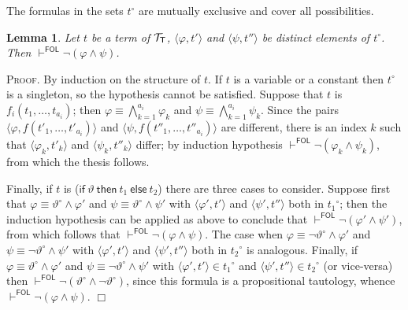 \documentclass{article}
\newtheorem{lemma}[definition]{Lemma}
\newenvironment{proof}{\smallskip\textsc{Proof.}}{\hspace*{\fill}$\Box$}
\newcommand{\ifthelse}[3]{\ensuremath{\mathsf{if}\ {#1}\ \mathsf{then}\ {#2}\ \mathsf{else}\ {#3}}}
\newcommand{\ofun}[1]{\ensuremath{{#1}^\circ}}
\newcommand{\pair}[2]{\ensuremath{\langle{#1},{#2}\rangle}}
\newcommand{\terms}[1]{\ensuremath{{\cal T}_{\mathsf{#1}}}}
\newcommand{\myvdash}[1]{\ensuremath{\vdash^{\mathsf{#1}}}}
\begin{document}
\bigskip\noindent
The formulas in the sets {\ofun t} are mutually exclusive and cover all
possibilities.
\begin{lemma}\label{ofunfalse}
Let $t$ be a term of {\terms{T}}, {\pair\varphi{t'}} and
{\pair\psi{t''}} be distinct elements of {\ofun{t}}.
Then $\myvdash{FOL}\neg(\varphi\wedge\psi)$.
\end{lemma}
\begin{proof}
By induction on the structure of $t$.  If $t$ is a variable or a constant
then {\ofun{t}} is a singleton, so the hypothesis cannot be satisfied.
Suppose that $t$ is $f_i(t_1,\ldots,t_{a_i})$; then
$\varphi\equiv\bigwedge_{k=1}^{a_i}\varphi_k$ and
$\psi\equiv\bigwedge_{k=1}^{a_i}\psi_k$.
Since the pairs {\pair\varphi{f(t'_1,\ldots,t'_{a_i})}} and
{\pair\psi{f(t''_1,\ldots,t''_{a_i})}} are different, there is an
index $k$ such that {\pair{\varphi_k}{t'_k}} and {\pair{\psi_k}{t''_k}}
differ; by induction hypothesis
$\myvdash{FOL}\neg(\varphi_k\wedge\psi_k)$, from which the thesis
follows.

Finally, if $t$ is {(\ifthelse\vartheta{t_1}{t_2})} there are three cases to
consider.  Suppose first that $\varphi\equiv\ofun\vartheta\wedge\varphi'$
and $\psi\equiv\ofun\vartheta\wedge\psi'$ with {\pair{\varphi'}{t'}} and
{\pair{\psi'}{t''}} both in {\ofun{t_1}}; then the induction
hypothesis can be applied as above to conclude that
$\myvdash{FOL}\neg(\varphi'\wedge\psi')$, from which follows
that $\myvdash{FOL}\neg(\varphi\wedge\psi)$.  The case when
$\varphi\equiv\neg\ofun\vartheta\wedge\varphi'$ and
$\psi\equiv\neg\ofun\vartheta\wedge\psi'$ with {\pair{\varphi'}{t'}} and
{\pair{\psi'}{t''}} both in {\ofun{t_2}} is analogous.  Finally, if
$\varphi\equiv\ofun\vartheta\wedge\varphi'$ and
$\psi\equiv\neg\ofun\vartheta\wedge\psi'$ with
${\pair{\varphi'}{t'}}\in{\ofun{t_1}}$ and
$\pair{\psi'}{t''}\in{\ofun{t_2}}$ (or vice-versa) then
$\myvdash{FOL}\neg(\ofun\vartheta\wedge\neg\ofun\vartheta)$, since this
formula is a propositional tautology, whence
$\myvdash{FOL}\neg(\varphi\wedge\psi)$.
\end{proof}
\end{document}
